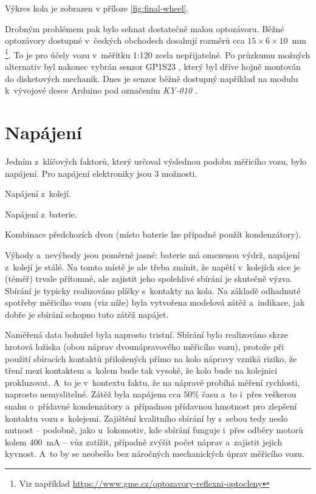 Výkres kola je zobrazen v příloze \ref{fig:final-wheel}.

Drobným problémem pak bylo sehnat dostatečně malou optozávoru. Běžné optozávory
dostupné v~českých obchodech dosahují rozměrů cca $15\times6\times10$~mm
\footnote{Viz například
\url{https://www.gme.cz/optozavory-reflexni-optocleny}}. To je pro účely vozu
v~měřítku 1:120 zcela nepřijatelné. Po
průzkumu možných alternativ byl nakonec vybrán senzor
GP1S23 \cite{gp1s23:datasheet}, který byl dříve hojně montován do disketových
mechanik. Dnes je senzor běžně dostupný například na modulu k~vývojové desce
Arduino pod označením \textit{KY-010} \cite{ky-010}.

\section{Napájení}
\label{sec:wsm-napajeni}

Jedním z~klíčových faktorů, který určoval výslednou podobu měřicího vozu, bylo
napájení. Pro napájení elektroniky jsou 3 možnosti.

\begin{compactenum}
\item Napájení z~kolejí.
\item Napájení z~baterie.
\item Kombinace předchozích dvou (místo baterie lze případně použít kondenzátory).
\end{compactenum}

Výhody a~nevýhody jsou poměrně jasné: baterie má omezenou výdrž, napájení
z~kolejí je stálé. Na tomto místě je ale třeba zmínit, že napětí v~kolejích
sice je (téměř) trvale přítomné, ale zajistit jeho spolehlivé sbírání je
skutečně výzva. Sbírání je typicky realizováno plíšky s~kontakty na kola.
Na základě odhadnuté spotřeby měřicího vozu (viz níže) byla vytvořena modelová
zátěž a~indikace, jak dobře je sbírání schopno tuto zátěž napájet.

Naměřená data bohužel byla naprosto tristní. Sbírání bylo realizováno skrze
hrotová ložiska (obou náprav dvounápravového měřicího vozu), protože při použití
sbíracích kontaktů přiložených přímo na kolo nápravy vzniká riziko, že tření mezi
kontaktem a~kolem bude tak vysoké, že kolo bude na kolejnici prokluzovat. A~to
je v~kontextu faktu, že na nápravě probíhá měření rychlosti, naprosto
nemyslitelné. Zátěž byla napájena cca $50 \%$ času a~to i~přes veškerou snahu
o~přídavné kondenzátory a~případnou přídavnou hmotnost pro zlepšení kontaktu
vozu s~kolejemi. Zajištění kvalitního sbírání by s~sebou tedy neslo nutnost --
podobně, jako u~lokomotiv, kde sbírání funguje i~přes odběry motorů kolem
$400$~mA -- vůz zatížit, případně zvýšit počet náprav a~zajistit jejich
kyvnost. A~to by se neobešlo bez náročných mechanických úprav měřicího vozu.


